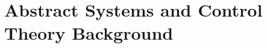 \documentclass{article} %
\begin{document}











\newpage
\appendix

\newpage
\section{Abstract Systems and Control Theory Background}
\label{sec:definitions_ctrl}
\end{document}
